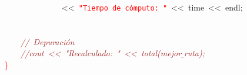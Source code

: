 \mbox{}\ \ \ \ \ \ \ \ \ \ \ \ \ \ \textcolor{BrickRed}{\textless{}\textless{}}\ \texttt{\textcolor{Red}{"{}Tiempo\ de\ cómputo:\ "{}}}\ \textcolor{BrickRed}{\textless{}\textless{}}\ time\ \textcolor{BrickRed}{\textless{}\textless{}}\ endl\textcolor{BrickRed}{;} \\
\mbox{}\ \ \ \  \\
\mbox{}\ \ \ \  \\
\mbox{}\ \ \ \ \textit{\textcolor{Brown}{//\ Depuración}} \\
\mbox{}\ \ \ \ \textit{\textcolor{Brown}{//cout\ \textless{}\textless{}\ "{}Recalculado:\ "{}\ \textless{}\textless{}\ total(mejor$\_$ruta);}} \\
\mbox{}\textcolor{Red}{\}} \\
\mbox{}
